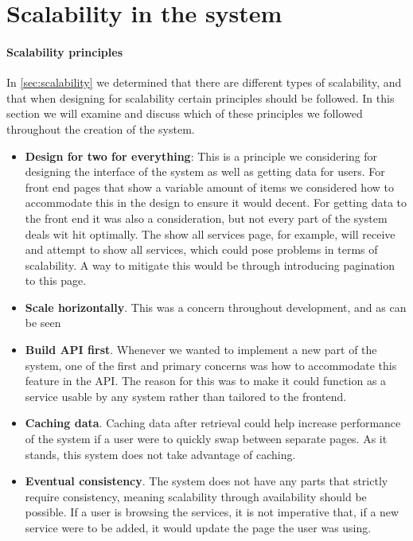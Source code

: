 \section{Scalability in the system}
\paragraph{Scalability principles}
In \autoref{sec:scalability} we determined that there are different types of scalability, and that when designing for scalability certain principles should be followed.
In this section we will examine and discuss which of these principles we followed throughout the creation of the system.

\begin{itemize}
    \item \textbf{Design for two for everything}: This is a principle we considering for designing the interface of the system as well as getting data for users.
    For front end pages that show a variable amount of items we considered how to accommodate this in the design to ensure it would decent.
    For getting data to the front end it was also a consideration, but not every part of the system deals wit hit optimally.
    The show all services page, for example, will receive and attempt to show all services, which could pose problems in terms of scalability.
    A way to mitigate this would be through introducing pagination to this page.
    \item \textbf{Scale horizontally}. This was a concern throughout development, and as can be seen 
    \item \textbf{Build API first}. Whenever we wanted to implement a new part of the system, one of the first and primary concerns was how to accommodate this feature in the API.
    The reason for this was to make it could function as a service usable by any system rather than tailored to the frontend. 
    \item \textbf{Caching data}. Caching data after retrieval could help increase performance of the system if a user were to quickly swap between separate pages. 
    As it stands, this system does not take advantage of caching.
    \item \textbf{Eventual consistency}. The system does not have any parts that strictly require consistency, meaning scalability through availability should be possible. 
    If a user is browsing the services, it is not imperative that, if a new service were to be added, it would update the page the user was using.

\end{itemize}
